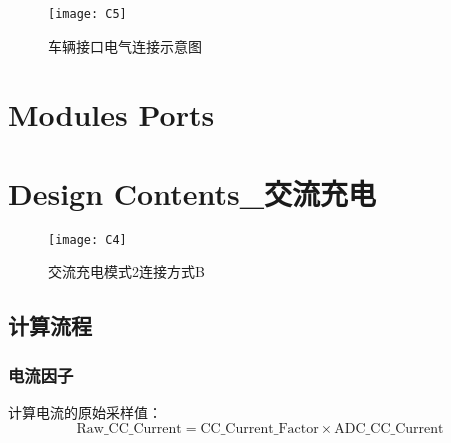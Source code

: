 \begin{figure}[!htbp]
    \centering
    \texttt{[image: C5]}
    \caption{车辆接口电气连接示意图}
    \label{fig:C5}
\end{figure}

\section{Modules Ports}


\section{Design Contents\_交流充电}








\begin{figure}[!htbp]
    \centering
    \texttt{[image: C4]}
    \caption{交流充电模式2连接方式B\cite{GB18487_1}}
    \label{fig:C3}
\end{figure}



\subsection{计算流程}
\subsubsection*{电流因子}
        计算电流的原始采样值：
            \begin{equation}
                \mathrm{Raw\_CC\_Current} = \mathrm{CC\_Current\_Factor} \times  \mathrm{ADC\_CC\_Current}
                \label{eq:CC1}
            \end{equation}

